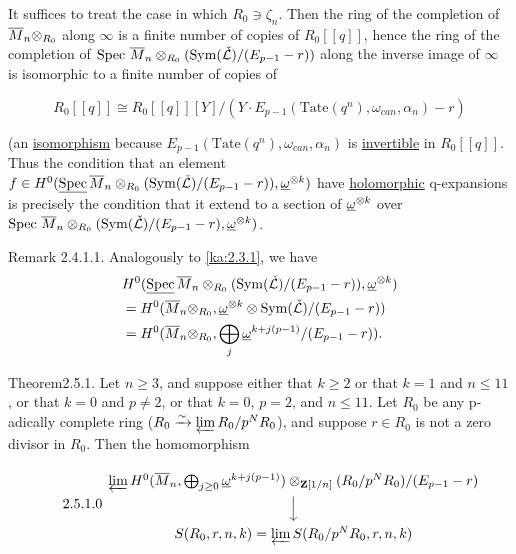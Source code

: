 \begin{kaproof}
It suffices to treat the case in which $R_0\ni\zeta_n$. Then the ring of the
completion of $\overline{M}_n\otimes_{R_0}$ along $\infty$ is a finite number of copies
of $R_0[[q]]$, hence the ring of the completion of
$\operatorname{Spec}\,\overline{M}_n\otimes_{R_0}(\operatorname{Sym}(\check{\mathcal{L}})/(E_{p-1}-r))$ along the inverse
image of $\infty$ is isomorphic to a finite number of copies of

\[
R_0[[q]]\cong R_0[[q]][Y]/(Y\cdot
E_{p-1}(\mathrm{Tate}(q^n),\omega_{can},\alpha_n)-r)
\]

(an \uline{isomorphism} because
$E_{p-1}(\mathrm{Tate}(q^n),\omega_{can},\alpha_n)$ is \uline{invertible} in
$R_0[[q]]$. Thus the condition that an element
$f\in H^0(\underline{\operatorname{Spec}}\,\overline{M}_n\otimes_{R_0}
(\operatorname{Sym}(\check{\mathcal{L}})/(E_{p-1}-r)),\underline{\omega}^{\otimes k})$ have \uline{holomorphic}
q-expansions is precisely the condition that it extend to a section of
$\underline{\omega}^{\otimes k}$ over $\operatorname{Spec}\,\overline{M}_n\otimes_{R_0}
(\operatorname{Sym}(\check{\mathcal{L}})/(E_{p-1}-r),\underline{\omega}^{\otimes k})$.
\end{kaproof}

\begin{kathmstar}{Remark 2.4.1.1.}
Analogously to \eqref{ka:2.3.1}, we have
\[
\begin{aligned}
&H^0(\underline{\operatorname{Spec}}\,\overline{M}_n\otimes_{R_0}
(\operatorname{Sym}(\check{\mathcal{L}})/(E_{p-1}-r)),\underline{\omega}^{\otimes k}) \\
&= H^0(\overline{M}_n\otimes_{R_0},\underline{\omega}^{\otimes k}\otimes
\operatorname{Sym}(\check{\mathcal{L}})/(E_{p-1}-r)) \\
&= H^0(\overline{M}_n\otimes_{R_0},\bigoplus_j
\underline{\omega}^{k+j(p-1)}/(E_{p-1}-r)).
\end{aligned}
\]
\end{kathmstar}


\begin{kathm}{Theorem}{2.5.1.}
Let $n\geq 3$, and suppose either that $k\geq 2$ or that $k=1$ and $n\leq 11$,
or that $k=0$ and $p\neq 2$, or that $k=0$, $p=2$, and $n\leq 11$. Let $R_0$ be
any p-adically complete ring ($R_0\xrightarrow{\sim}\varprojlim R_0/p^N R_0$),
and suppose $r\in R_0$ is not a zero divisor in $R_0$. Then the homomorphism
\end{kathm}

\begin{equation}\tag*{2.5.1.0}\label{ka:2.5.1.0}
\begin{tikzcd}
\varprojlim H^0(\Mbar_n,\bigoplus_{j\geq 0}\w^{k+j(p-1)})\tens_{\Z[1/n]}
(R_0/p^N R_0)/(E_{p-1}-r) \arrow[d] \\
S(R_0,r,n,k) = \varprojlim S(R_0/p^N R_0,r,n,k)
\end{tikzcd}
\end{equation}

